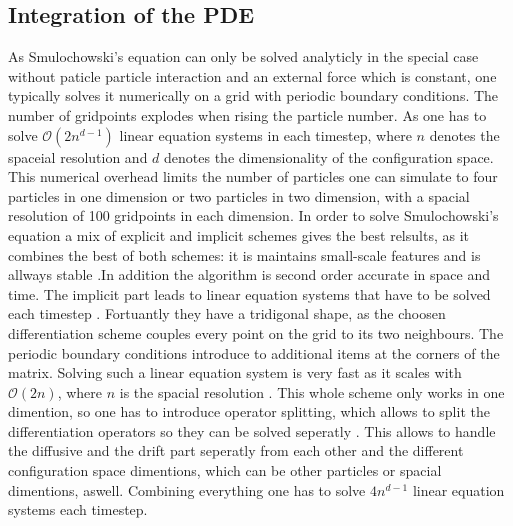 \documentclass[a4paper]{article}
\begin{document}
\subsection{Integration of the PDE}
As Smulochowski's equation can only be solved analyticly in the special case without paticle particle interaction and an external force which is constant, one typically solves it numerically on a grid with periodic boundary conditions. The number of gridpoints explodes when rising the particle number. As one has to solve $\mathcal{O}(2n^{d-1})$ linear equation systems in each timestep, where $n$ denotes the spaceial resolution and $d$ denotes the dimensionality of the configuration space. This numerical overhead limits the number of particles one can simulate to four particles in one dimension or two particles in two dimension, with a spacial resolution of 100 gridpoints in each dimension. In order to solve Smulochowski's equation a mix of explicit and implicit schemes gives the best relsults, as it combines the best of both schemes: it is maintains small-scale features and is allways stable \cite{numericalRecepies}.In addition the algorithm is second order accurate in space and time. The implicit part leads to linear equation systems that have to be solved each timestep \cite{Tobi}. Fortuantly they have a tridigonal shape, as the choosen differentiation scheme couples every point on the grid to its two neighbours. The periodic boundary conditions introduce to additional items at the corners of the matrix. Solving such a linear equation system is very fast as it scales with  $\mathcal{O}(2n)$, where $n$ is the spacial resolution \cite{numericalRecepies}. This whole scheme only works in one dimention, so one has to introduce operator splitting, which allows to split the differentiation operators so they can be solved seperatly \cite{numericalRecepies}. This allows to handle the diffusive and the drift part seperatly from each other and the different configuration space dimentions, which can be other particles or spacial dimentions, aswell. Combining everything one has to solve $4n^{d-1}$ linear equation systems each timestep. 
\end{document}
